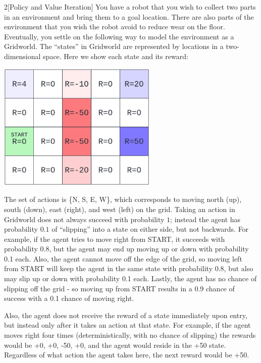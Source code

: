 \documentclass[expanded]{lkx_pset}
\begin{document}
\begin{problem}{2}[Policy and Value Iteration]
You have a robot that you wish to collect two parts in an environment
and bring them to a goal location.  There are also parts of the
environment that you wish the robot avoid to reduce wear on the floor.
Eventually, you settle on the following way to model the environment
as a Gridworld.  The ``states'' in Gridworld are represented by
locations in a two-dimensional space.  Here we show each state and its
reward:
\end{problem}

\begin{solution}
	\begin{center}
		\includegraphics[width=3in]{images/gridworld.png}
	\end{center}

	The set of actions is \{N, S, E, W\}, which corresponds to moving north (up), south (down), east (right), and west (left) on the grid. Taking an action in Gridworld does not always succeed with probability
	$1$; instead the agent has probability $0.1$ of ``slipping'' into a
	state on either side, but not backwards.  For example, if the agent tries to move right from START, it succeeds with probability 0.8, but the agent may end up moving up or down with probability 0.1 each. Also, the agent cannot move off the edge of the grid, so moving left from START will keep the agent in the same state with probability 0.8, but also may slip up or down with probability 0.1 each. Lastly, the agent has no chance of slipping off the grid - so moving up from START results in a 0.9 chance of success with a 0.1 chance of moving right.

	Also, the agent does not receive the reward of a state immediately upon entry, but instead only after it takes an action at that state. For example, if the agent moves right four times (deterministically, with no chance of slipping) the rewards would be +0, +0, -50, +0, and the agent would reside in the +50 state. Regardless of what action the agent takes here, the next reward would be +50.


\end{solution}
\end{document}
